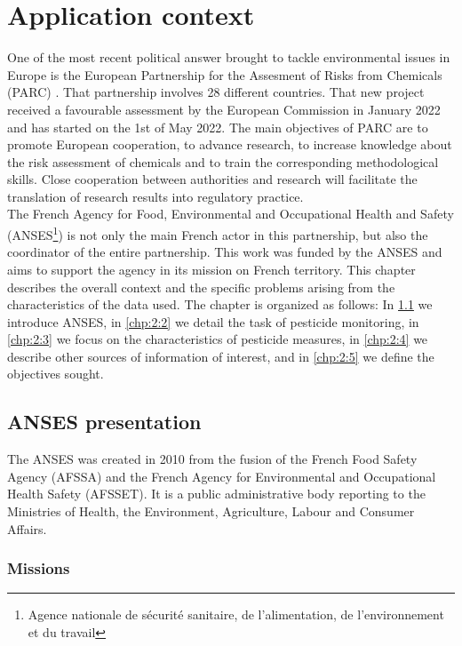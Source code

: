 \chapter{Application context}\label{chp:2}

\minitoc

\clearpage

One of the most recent political answer brought to tackle environmental issues in Europe is the European Partnership for the Assesment of Risks from Chemicals (PARC) \cite{PARC}. That partnership involves 28 different countries. That new project received a favourable assessment by the European Commission in January 2022 and has started on the 1st of May 2022. The main objectives of PARC are to promote European cooperation, to advance research, to increase knowledge about the risk assessment of chemicals and to train the corresponding methodological skills. Close cooperation between authorities and research will facilitate the translation of research results into regulatory practice. \\
The French Agency for Food, Environmental and Occupational Health and Safety (ANSES\footnote{Agence nationale de sécurité sanitaire, de l'alimentation, de l'environnement et du travail}) is not only the main French actor in this partnership, but also the coordinator of the entire partnership. This work was funded by the ANSES and aims to support the agency in its mission on French territory. This chapter describes the overall context and the specific problems arising from the characteristics of the data used. The chapter is organized as follows: In \ref{chp:2:1} we introduce ANSES, in \ref{chp:2:2} we detail the task of pesticide monitoring, in \ref{chp:2:3} we focus on the characteristics of pesticide measures, in \ref{chp:2:4} we describe other sources of information of interest, and in \ref{chp:2:5} we define the objectives sought.    

\section{ANSES presentation}\label{chp:2:1}

The ANSES was created in 2010 from the fusion of the French Food Safety Agency (AFSSA) and the French Agency for Environmental and Occupational Health Safety (AFSSET). It is a public administrative body reporting to the Ministries of Health, the Environment, Agriculture, Labour and Consumer Affairs.  

\subsection{Missions} 


